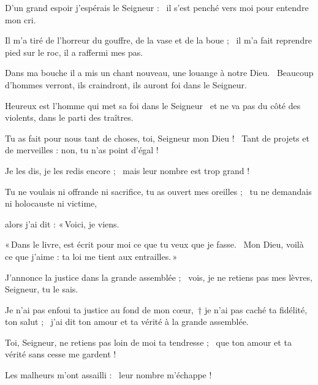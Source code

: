 \item D'un grand espoir j'espérais le Seigneur :~\psstar{} il s'est penché vers moi pour entendre mon cri.

\item Il m'a tiré de l'horreur du gouffre, de la vase et de la boue ;~\psstar{} il m'a fait reprendre pied sur le roc, il a raffermi mes pas.

\item Dans ma bouche il a mis un chant nouveau, une louange à notre Dieu.~\psstar{} Beaucoup d'hommes verront, ils craindront, ils auront foi dans le Seigneur.

\item Heureux est l'homme qui met sa foi dans le Seigneur~\psstar{} et ne va pas du côté des violents, dans le parti des traîtres.

\item Tu as fait pour nous tant de choses, toi, Seigneur mon Dieu !~\psstar{} Tant de projets et de merveilles : non, tu n'as point d'égal ! 

\item Je les dis, je les redis encore ;~\psstar{} mais leur nombre est trop grand !

\item Tu ne voulais ni offrande ni sacrifice, tu as ouvert mes oreilles ;~\psstar{} tu ne demandais ni holocauste ni victime,

\item alors j'ai dit : «\,Voici, je viens.

\item «\,Dans le livre, est écrit pour moi ce que tu veux que je fasse.~\psstar{} Mon Dieu, voilà ce que j'aime : ta loi me tient aux entrailles.\,»

\item J'annonce la justice dans la grande assemblée ;~\psstar{} vois, je ne retiens pas mes lèvres, Seigneur, tu le sais.

\item Je n'ai pas enfoui ta justice au fond de mon cœur,~† je n'ai pas caché ta fidélité, ton salut ;~\psstar{} j'ai dit ton amour et ta vérité à la grande assemblée.

\item Toi, Seigneur, ne retiens pas loin de moi ta tendresse ;~\psstar{} que ton amour et ta vérité sans cesse me gardent !

\item Les malheurs m'ont assailli :~\psstar{} leur nombre m'échappe ! 

